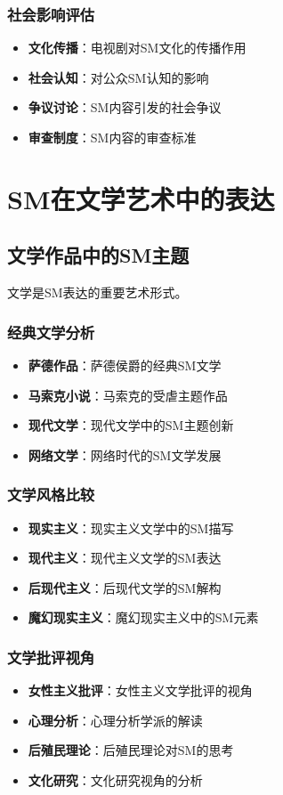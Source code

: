 \documentclass[12pt,UTF8]{ctexbook}
\begin{document}
\subsection{社会影响评估}
\begin{itemize}[leftmargin=2cm]
	\item \textbf{文化传播}：电视剧对SM文化的传播作用
	\item \textbf{社会认知}：对公众SM认知的影响
	\item \textbf{争议讨论}：SM内容引发的社会争议
	\item \textbf{审查制度}：SM内容的审查标准
\end{itemize}

\chapter{SM在文学艺术中的表达}
\section{文学作品中的SM主题}
文学是SM表达的重要艺术形式。

\subsection{经典文学分析}
\begin{itemize}[leftmargin=2cm]
	\item \textbf{萨德作品}：萨德侯爵的经典SM文学
	\item \textbf{马索克小说}：马索克的受虐主题作品
	\item \textbf{现代文学}：现代文学中的SM主题创新
	\item \textbf{网络文学}：网络时代的SM文学发展
\end{itemize}

\subsection{文学风格比较}
\begin{itemize}[leftmargin=2cm]
	\item \textbf{现实主义}：现实主义文学中的SM描写
	\item \textbf{现代主义}：现代主义文学的SM表达
	\item \textbf{后现代主义}：后现代文学的SM解构
	\item \textbf{魔幻现实主义}：魔幻现实主义中的SM元素
\end{itemize}

\subsection{文学批评视角}
\begin{itemize}[leftmargin=2cm]
	\item \textbf{女性主义批评}：女性主义文学批评的视角
	\item \textbf{心理分析}：心理分析学派的解读
	\item \textbf{后殖民理论}：后殖民理论对SM的思考
	\item \textbf{文化研究}：文化研究视角的分析
\end{itemize}
\end{document}

